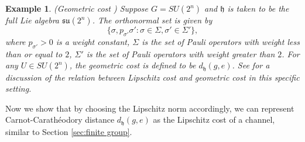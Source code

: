 \documentclass[11pt,reqno]{amsart}
\numberwithin{equation}{section}
\newtheorem{example}[lemma]{Example}
\begin{document}
\begin{example}(Geometric cost \cite{N1,N2,N3})
Suppose $G = SU(2^n)$ and $\mathfrak{h}$ is taken to be the full Lie algebra $\mathfrak{su}(2^n)$. The orthonormal set is given by 
\begin{equation}
\{\sigma, p_{\sigma'} \sigma': \sigma \in \Sigma, \sigma'\in \Sigma'\},
\end{equation}
where $p_{\sigma'}>0$ is a weight constant, $\Sigma$ is the set of Pauli operators with weight less than or equal to $2$, $\Sigma'$ is the set of Pauli operators with weight greater than $2$. For any $U\in SU(2^n)$, the geometric cost is defined to be $d_\mathfrak{h}(g,e)$. See \cite{araiza2023} for a discussion of the relation between Lipschitz cost and geometric cost in this specific setting. 
\end{example}
Now we show that by choosing the Lipschitz norm accordingly, we can represent Carnot-Carath\'eodory distance $d_\mathfrak{h}(g,e)$ as the Lipschitz cost of a channel, similar to Section \ref{sec:finite group}.
\end{document}
